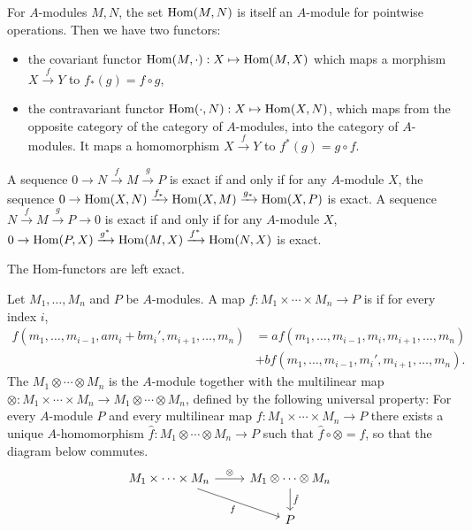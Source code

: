 For $A$-modules $M, N$, the set $\operatorname{Hom}(M, N)$ is itself an $A$-module for
pointwise operations.
Then we have two functors:
\begin{itemize}
\item the covariant functor $\operatorname{Hom}(M, \cdot): X \mapsto \operatorname{Hom}(M, X)$ which maps a
  morphism $X \xrightarrow{f} Y$ to $f_*(g) = f \circ g$,
\item the contravariant functor $\operatorname{Hom}(\cdot, N): X \mapsto \operatorname{Hom}(X, N)$, which
  maps from the opposite category of the category of $A$-modules, into the
  category of $A$-modules.
  It maps a homomorphism $X \xrightarrow{f} Y$ to $f^*(g) = g \circ f$.
\end{itemize}

\begin{lemma}
  \label{lemma:koma-01-exact}
  A sequence $0 \to N \xrightarrow{f} M \xrightarrow{g} P$ is exact if and
  only if for any $A$-module $X$, the sequence $0 \to \operatorname{Hom}(X, N)
  \xrightarrow{f_*} \operatorname{Hom}(X,M) \xrightarrow{g_*} \operatorname{Hom}(X,P)$ is exact.
  A sequence $N \xrightarrow{f} M \xrightarrow{g} P \to 0$ is exact if and only
  if for any $A$-module $X$, $0 \to \operatorname{Hom}(P, X) \xrightarrow{g^*} \operatorname{Hom}(M,X)
  \xrightarrow{f^*} \operatorname{Hom}(N,X)$ is exact.
\end{lemma}

\begin{remark}
  The Hom-functors are left exact.
\end{remark}

\begin{definition}
  Let $M_1, \ldots, M_n$ and $P$ be $A$-modules.
  A map $f: M_1 \times \cdots \times M_n \to P$ is  if
  for every index $i$,
  \begin{align*}
	f(m_1, \ldots, m_{i-1}, a m_i + b m_i', m_{i+1}, \ldots, m_n)
	&= a f(m_1, \ldots, m_{i-1}, m_i, m_{i+1}, \ldots, m_n) \\
	&+ b f(m_1, \ldots, m_{i-1}, m_i', m_{i+1}, \ldots, m_n).
  \end{align*}
  The  $M_1 \otimes \cdots \otimes M_n$ is the $A$-module
  together with the multilinear map $\otimes: M_1 \times \cdots \times M_n \to
  M_1 \otimes \cdots \otimes M_n$, defined by the following universal property:
  For every $A$-module $P$ and every multilinear map $f: M_1 \times \cdots
  \times M_n \to P$ there exists a unique $A$-homomorphism $\hat{f}: M_1 \otimes
  \cdots \otimes M_n \to P$ such that $\hat{f} \circ \otimes = f$, so that the
  diagram below commutes.
  \[
	\begin{tikzcd}
	  {M_1 \times \cdots \times M_n} & {M_1 \otimes \cdots \otimes M_n} \\
	  & P
	  \arrow["\otimes", from=1-1, to=1-2]
	  \arrow["f"', from=1-1, to=2-2]
	  \arrow["{\hat{f}}", from=1-2, to=2-2]
	\end{tikzcd}
  \]
\end{definition}

